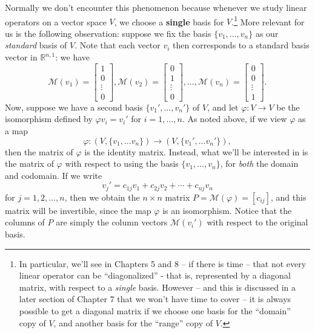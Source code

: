 \documentclass[12pt,letterpaper]{article}
\newcommand{\M}{\mathcal{M}}
\newcommand{\R}{\mathbb{R}}
\begin{document}
Normally we don't encounter this phenomenon because whenever we study linear operators on a vector space $V$, we choose a {\bf single} basis for $V$.\footnote{In particular, we'll see in Chapters 5 and 8 -- if there is time -- that not every linear operator can be ``diagonalized'' - that is, represented by a diagonal matrix, with respect to a {\em single} basis. However -- and this is discussed in a later section of Chapter 7 that we won't have time to cover -- it is always possible to get a diagonal matrix if we choose one basis for the ``domain'' copy of $V$, and another basis for the ``range'' copy of $V$.} More relevant for us is the following observation: suppose we fix the basis $\{v_1,\ldots, v_n\}$ as our {\em standard} basis of $V$. Note that each vector $v_i$ then corresponds to a standard basis vector in $\R^{n,1}$: we have
\[
\M(v_1) = \begin{bmatrix}1\\0\\\vdots \\0\end{bmatrix}, \M(v_2) = \begin{bmatrix}
0\\1\\\vdots\\0
\end{bmatrix}, \ldots, \M(v_n) =\begin{bmatrix}0\\0\\\vdots\\1\end{bmatrix}.
\]
Now, suppose we have a second basis $\{v_1',\ldots, v_n'\}$ of $V$, and let $\varphi:V\to V$ be the isomorphism defined by $\varphi v_i = v_i'$ for $i=1,\ldots, n$. As noted above, if we view $\varphi$ as a map
\[
\varphi: (V,\{v_1,\ldots v_n\})\to (V,\{v_1',\ldots v_n'\}),
\]
then the matrix of $\varphi$ is the identity matrix. Instead, what we'll be interested in is the matrix of $\varphi$ with respect to using the basis $\{v_1,\ldots, v_n\}$, for {\em both} the domain and codomain. If we write
\[
v_j' = c_{1j}v_1+c_{2j}v_2+\cdots + c_{nj}v_n
\]
for $j=1,2,\ldots, n$, then we obtain the $n\times n$ matrix $P = \M(\varphi) = [c_{ij}]$, and this matrix will be invertible, since the map $\varphi$ is an isomorphism. Notice that the columns of $P$ are simply the column vectors $\M(v_i')$ with respect to the original basis.
\end{document}
